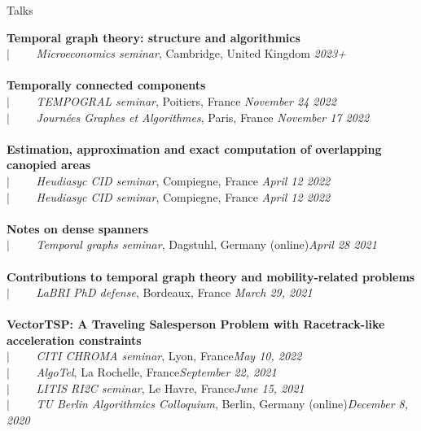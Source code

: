 \documentclass[french]{resume} %
\begin{document}
	\begin{rSection}{Talks}
		
		{\bf Temporal graph theory: structure and algorithmics} \\
		$| \qquad$ \textit{Microeconomics seminar}, Cambridge, United Kingdom \hfill {\em 2023+} 
		\\ \\
		{\bf Temporally connected components} \\
		$| \qquad$ \textit{TEMPOGRAL seminar}, Poitiers, France \hfill {\em November 24 2022} 
		\\
		$| \qquad$ \textit{Journées Graphes et Algorithmes}, Paris, France \hfill {\em November 17 2022}
		\\ \\
		{\bf Estimation, approximation and exact computation of overlapping canopied areas} \\
		$| \qquad$ \textit{Heudiasyc CID seminar}, Compiegne, France \hfill {\em April 12 2022} \\
		$| \qquad$ \textit{Heudiasyc CID seminar}, Compiegne, France \hfill {\em April 12 2022}
		\\ \\
		{\bf Notes on dense spanners} \\
		$| \qquad$ \textit{Temporal graphs seminar}, Dagstuhl, Germany (online)\hfill {\em April 28 2021} 
		\\ \\	
		{\bf Contributions to temporal graph theory and mobility-related problems} \\
		$| \qquad$ \textit{LaBRI PhD defense}, Bordeaux, France\hfill {\em 
			March 29, 2021} 
		\\ \\	
		{\bf VectorTSP: A Traveling Salesperson Problem with Racetrack-like acceleration constraints}\\
		$| \qquad$ \textit{CITI CHROMA seminar}, Lyon, France\hfill {\em May 10, 2022}\\
		$| \qquad$ \textit{AlgoTel}, La Rochelle, France\hfill {\em September 22, 2021}\\
		$| \qquad$ \textit{LITIS RI2C seminar}, Le Havre, France\hfill {\em June 15, 2021}\\
		$| \qquad$ \textit{TU Berlin Algorithmics Colloquium}, Berlin, Germany (online)\hfill {\em December 8, 2020}\\

\end{rSection}
\end{document}
